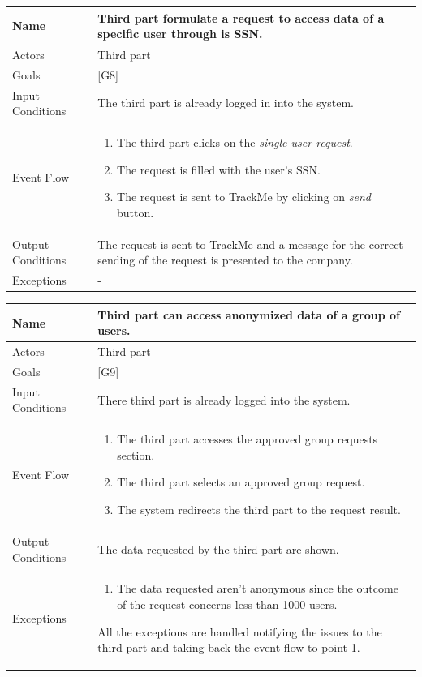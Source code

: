 \documentclass{article}
\begin{document}
\begin{center}
    \begin{tabular}{ | l | p{10cm} |}
    \hline
    Name & Third part formulate a request to access data of a specific user through is SSN. \\ \hline
    Actors & Third part\\ \hline
   	Goals & {[G8]}\\ \hline
    Input Conditions & The third part is already logged in into the system.\\ \hline
    Event Flow & \begin{enumerate}
    	\item The third part clicks on the \emph{single user request}.
    	\item The request is filled with the user's SSN.
    	\item The request is sent to TrackMe by clicking on \emph{send} button. 
    \end{enumerate} \\ \hline
    Output Conditions & The request is sent to TrackMe and a message for the correct sending of the request is presented to the company.  \\ \hline
    Exceptions & -    \\ \hline
    \end{tabular}
\end{center}

\begin{center}
    \begin{tabular}{ | l | p{10cm} |}
    \hline
    Name & Third part can access anonymized data of a group of users.\\ \hline
    Actors & Third part\\ \hline
   	Goals & {[G9]}\\ \hline
    Input Conditions & There third part is already logged into the system.\\ \hline
    Event Flow & \begin{enumerate}
    	\item The third part accesses the approved group requests section.
		\item The third part selects an approved group request.
		\item The system redirects the third part to the request result.
    \end{enumerate} \\ \hline
    Output Conditions & The data requested by the third part are shown.  \\ \hline
    Exceptions & \begin{enumerate}
  		\item The data requested aren't anonymous since the outcome of the request concerns less than 1000 users.
\end{enumerate} All the exceptions are handled notifying the issues to the third part and taking back the event flow to point 1.    \\ \hline
    \end{tabular}
\end{center}
\end{document}
